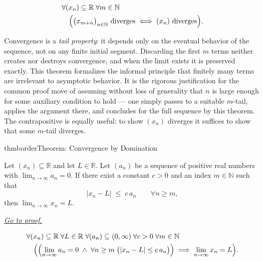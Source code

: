 \begin{remark*}
\[
\begin{aligned}
&\forall (x_n) \subseteq \mathbb{R} \;\forall m \in \mathbb{N}\\
&\quad\Bigl(
    \bigl(x_{m+n}\bigr)_{n \in \mathbb{N}} \text{ diverges}
    \;\Longleftrightarrow\;
    (x_n) \text{ diverges}
\Bigr).
\end{aligned}
\]
\end{remark*}

\begin{remark*}[Interpretation]
Convergence is a \emph{tail property}: it depends only on the
eventual behavior of the sequence, not on any finite initial
segment. Discarding the first $m$ terms neither creates nor
destroys convergence, and when the limit exists it is preserved
exactly. This theorem formalizes the informal principle that
finitely many terms are irrelevant to asymptotic behavior. It is
the rigorous justification for the common proof move of assuming
without loss of generality that $n$ is large enough for some
auxiliary condition to hold — one simply passes to a suitable
$m$-tail, applies the argument there, and concludes for the full
sequence by this theorem. The contrapositive is equally useful:
to show $(x_n)$ diverges it suffices to show that some $m$-tail
diverges.
\end{remark*}









\begin{bpnew}{thmborder}{Theorem: Convergence by Domination}
\begin{theorem}
\label{thm:convergence-by-domination}

Let $(x_n) \subseteq \mathbb{R}$ and let $L \in \mathbb{R}$. Let
$(a_n)$ be a sequence of positive real numbers with
$\displaystyle\lim_{n \to \infty} a_n = 0$. If there exist a constant
$c > 0$ and an index $m \in \mathbb{N}$ such that
\[
    |x_n - L| \;\le\; c\, a_n \qquad \forall n \ge m,
\]
then $\displaystyle\lim_{n \to \infty} x_n = L$.

\smallskip
\noindent
\hyperref[prf:convergence-by-domination]{\textit{Go to proof.}}
\end{theorem}
\end{bpnew}

\begin{remark*}
\[
\begin{aligned}
&\forall (x_n) \subseteq \mathbb{R} \;\forall L \in \mathbb{R}
 \;\forall (a_n) \subseteq (0, \infty) \;\forall c > 0
 \;\forall m \in \mathbb{N}\\
&\quad\Bigl(
    \Bigl(
        \lim_{n \to \infty} a_n = 0
        \;\land\;
        \forall n \ge m \;\bigl(|x_n - L| \le c\, a_n\bigr)
    \Bigr)
    \;\Longrightarrow\;
    \lim_{n \to \infty} x_n = L
\Bigr).
\end{aligned}
\]
\end{remark*}

